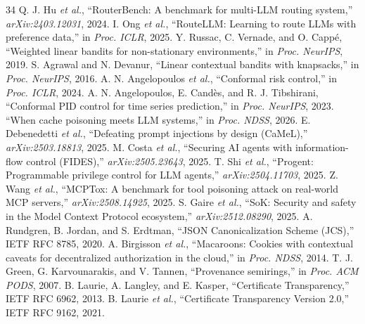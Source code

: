 \documentclass[10pt,twocolumn,letterpaper]{article}
\begin{document}
\begin{thebibliography}{34}
 Q. J. Hu \emph{et al.}, ``RouterBench: A benchmark for multi-LLM routing system,'' \emph{arXiv:2403.12031}, 2024.
 I. Ong \emph{et al.}, ``RouteLLM: Learning to route LLMs with preference data,'' in \emph{Proc. ICLR}, 2025.
 Y. Russac, C. Vernade, and O. Capp\'e, ``Weighted linear bandits for non-stationary environments,'' in \emph{Proc. NeurIPS}, 2019.
 S. Agrawal and N. Devanur, ``Linear contextual bandits with knapsacks,'' in \emph{Proc. NeurIPS}, 2016.
 A. N. Angelopoulos \emph{et al.}, ``Conformal risk control,'' in \emph{Proc. ICLR}, 2024.
 A. N. Angelopoulos, E. Cand\`es, and R. J. Tibshirani, ``Conformal PID control for time series prediction,'' in \emph{Proc. NeurIPS}, 2023.
 ``When cache poisoning meets LLM systems,'' in \emph{Proc. NDSS}, 2026.
 E. Debenedetti \emph{et al.}, ``Defeating prompt injections by design (CaMeL),'' \emph{arXiv:2503.18813}, 2025.
 M. Costa \emph{et al.}, ``Securing AI agents with information-flow control (FIDES),'' \emph{arXiv:2505.23643}, 2025.
 T. Shi \emph{et al.}, ``Progent: Programmable privilege control for LLM agents,'' \emph{arXiv:2504.11703}, 2025.
 Z. Wang \emph{et al.}, ``MCPTox: A benchmark for tool poisoning attack on real-world MCP servers,'' \emph{arXiv:2508.14925}, 2025.
 S. Gaire \emph{et al.}, ``SoK: Security and safety in the Model Context Protocol ecosystem,'' \emph{arXiv:2512.08290}, 2025.
 A. Rundgren, B. Jordan, and S. Erdtman, ``JSON Canonicalization Scheme (JCS),'' IETF RFC 8785, 2020.
 A. Birgisson \emph{et al.}, ``Macaroons: Cookies with contextual caveats for decentralized authorization in the cloud,'' in \emph{Proc. NDSS}, 2014.
 T. J. Green, G. Karvounarakis, and V. Tannen, ``Provenance semirings,'' in \emph{Proc. ACM PODS}, 2007.
 B. Laurie, A. Langley, and E. Kasper, ``Certificate Transparency,'' IETF RFC 6962, 2013.
 B. Laurie \emph{et al.}, ``Certificate Transparency Version 2.0,'' IETF RFC 9162, 2021.
\end{thebibliography}
\end{document}
